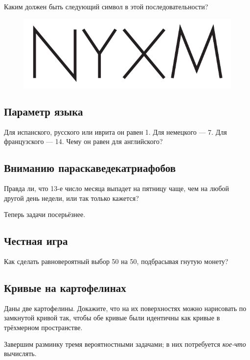 Каким должен быть следующий символ в этой последовательности?

\begin{figure}[h!]
\centering
\includegraphics[scale=0.5]{pics/ZYXW}
\end{figure}

\subsection*{Параметр языка}

Для испанского, русского или иврита он равен 1.
Для немецкого --- 7.
Для французского --- 14.
Чему он равен для английского?

\subsection*{Вниманию параскаведекатриафобов}

Правда ли, что 13-е число месяца выпадет на пятницу чаще,
чем на любой другой день недели,
или так только кажется?

\medskip

Теперь задачи посерьёзнее.

\subsection*{Честная игра}

Как сделать равновероятный выбор 50 на 50, подбрасывая гнутую монету?

\subsection*{Кривые на картофелинах}\label{Кривые на картофелинах}

Даны две картофелины.
Докажите, что на их поверхностях можно нарисовать по замкнутой кривой так, чтобы обе кривые были идентичны как кривые в трёхмерном пространстве.

\medskip

Завершим разминку тремя вероятностными задачами; в них потребуется \emph{кое-что} вычислять.

